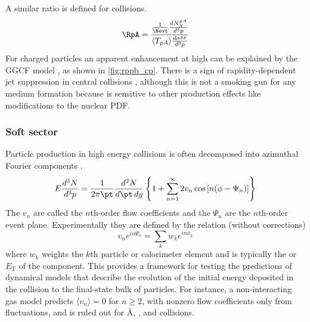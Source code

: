 A similar ratio is defined for \pA collisions.
\begin{equation}
  \RpA = \frac{\frac{1}{\Nevt}\frac{d N^{pA}_{X}}{d^3 p}}{\langle T_{pA} \rangle \frac{d\sigma^{pp}}{d^3 p}}
\end{equation}
For charged particles an apparent enhancement at high \pt can be explained by the \ac{GGCF} model \cite{HION-2012-14}, as shown in \cref{fig:rppb_cp}.
There is a sign of rapidity-dependent jet suppression in central \pPb collisions \cite{HION-2013-08}, although this is not a smoking gun for any medium formation because \RpPb is sensitive to other production effects like modifications to the nuclear \ac{PDF}.


\FloatBarrier
\subsubsection{Soft sector}

Particle production in high energy collisions is often decomposed into azimuthal Fourier components \cite{Voloshin:1994mz,Poskanzer:1998yz}. %
\begin{equation}
  \label{eq:flow_coefficients}
  E \frac{d^3 N}{d^3 p} = \frac{1}{2\pi \pt} \frac{d^2 N}{d\pt \, dy}\left\{ 1 + \sum_{n=1}^{\infty} 2v_n \cos\left[n(\phi - \Psi_n) \right] \right\}
\end{equation}
The $v_n$ are called the $n$th-order flow coefficients and the $\Psi_n$ are the $n$th-order event plane.
Experimentally they are defined by the relation (without corrections)
\begin{equation}
v_n e^{in\Psi_n} = \sum_k w_k e^{in\phi_k}
\end{equation}
where $w_k$ weights the $k$th particle or calorimeter element and is typically the \pt or $E_\mathrm{T}$ of the component.
This provides a framework for testing the predictions of dynamical models that describe the evolution of the initial energy deposited in the collision to the final-state bulk of particles.
For instance, a non-interacting gas model predicts $\langle v_n \rangle = 0$ for $n \geq 2$, with nonzero flow coefficients only from fluctuations, and is ruled out for \AA, \pA, and \pp collisions.

